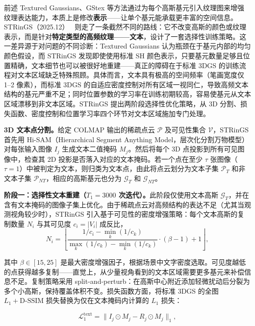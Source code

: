 前述 Textured Gaussians、GStex 等方法通过为每个高斯基元引入纹理图来增强纹理表达能力，本质上是修改\textbf{表示}——让单个基元能承载更丰富的空间信息。STRinGS（2025.12）~\cite{2512_07230} 则走了一条截然不同的路线：它不改变高斯的颜色或纹理表示，而是针对\textbf{特定类型的高频纹理——文本}，设计了一套选择性训练策略。这一差异源于对问题的不同诊断：Textured Gaussians 认为瓶颈在于基元内部的均匀颜色假设，而 STRinGS 发现即使使用标准 SH 颜色表示，只要基元数量足够且位置精确，文本细节也可以被很好地重建——真正的障碍在于标准 3DGS 的训练流程对文本区域缺乏特殊照顾。具体而言，文本具有极高的空间频率（笔画宽度仅 1--2 像素），而标准 3DGS 的自适应密度控制对所有区域一视同仁，导致高频文本结构的基元严重不足；同时位置参数的学习率在训练初期较高，容易使基元从文本区域漂移到非文本区域。STRinGS 提出两阶段选择性优化策略，从 3D 分割、损失函数、密度控制和位置学习率四个环节对文本区域施加专门处理。

\textbf{3D 文本点分割。}给定 COLMAP 输出的稀疏点云 $\mathcal{P}$ 及可见性集合 $\mathcal{V}$，STRinGS 首先用 Hi-SAM（Hierarchical Segment Anything Model，层次化分割万物模型）对每张输入图像 $I_j$ 生成文本二值掩码 $M_j$。然后将每个 3D 点投影到所有可见图像中，检查其 2D 投影是否落入对应的文本掩码。若一个点在至少 $\tau$ 张图像（$\tau=1$）中被判定为文本，则归类为文本点，由此将点云划分为文本子集 $\mathcal{P}_T$ 和非文本子集 $\mathcal{P}_{NT}$，相应的高斯基元也分为 $\mathcal{G}_T$ 和 $\mathcal{G}_{NT}$。

\textbf{阶段一：选择性文本重建（$T_1 = 3000$ 次迭代）。}此阶段仅使用文本高斯 $\mathcal{G}_T$，并在含有文本掩码的图像子集上优化。由于稀疏点云对高频结构的表达不足（尤其当观测视角较少时），STRinGS 引入基于可见性的密度增强策略：每个文本高斯的复制数量 $N_i$ 与其可见度 $c_i = |V_i|$ 成反比，
\begin{equation}
N_i = \left\lfloor \frac{1/c_i - \min_k(1/c_k)}{\max_k(1/c_k) - \min_k(1/c_k)} \cdot (\beta - 1) + 1 \right\rfloor,
\end{equation}

其中 $\beta \in [15, 25]$ 是最大密度增强因子，根据场景中文字密度选取。可见度越低的点获得越多复制——直觉上，从少量视角看到的文本区域需要更多基元来补偿信息不足。复制策略采用 split-and-perturb：在高斯中心附近添加轻微扰动后分裂为多个小高斯，保持覆盖体积不变。损失函数方面，将标准 3DGS 的全图 $L_1 + \text{D-SSIM}$ 损失替换为仅在文本掩码内计算的 $L_1$ 损失：

\begin{equation}
\mathcal{L}_1^{\text{text}} = \| I_j \odot M_j - R_j \odot M_j \|_1,
\end{equation}

